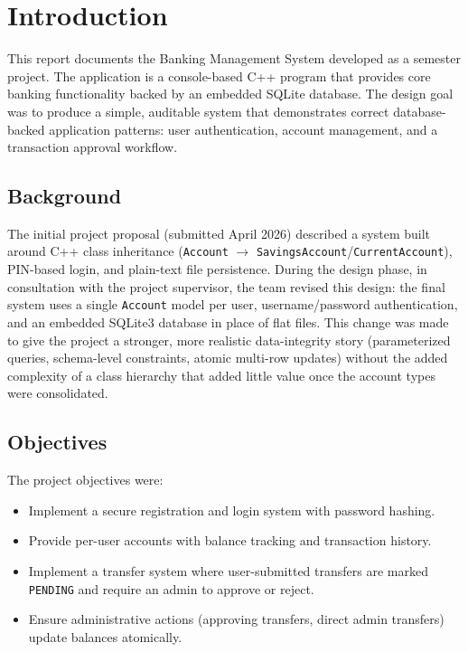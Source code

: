 \chapter{Introduction}

This report documents the Banking Management System developed as a semester project. The application is a console-based C++ program that provides core banking functionality backed by an embedded SQLite database. The design goal was to produce a simple, auditable system that demonstrates correct database-backed application patterns: user authentication, account management, and a transaction approval workflow.

\section{Background}
The initial project proposal (submitted April 2026) described a system built around C++ class inheritance (\texttt{Account} $\rightarrow$ \texttt{SavingsAccount}/\texttt{CurrentAccount}), PIN-based login, and plain-text file persistence. During the design phase, in consultation with the project supervisor, the team revised this design: the final system uses a single \texttt{Account} model per user, username/password authentication, and an embedded SQLite3 database in place of flat files. This change was made to give the project a stronger, more realistic data-integrity story (parameterized queries, schema-level constraints, atomic multi-row updates) without the added complexity of a class hierarchy that added little value once the account types were consolidated.

\section{Objectives}
The project objectives were:
\begin{itemize}
    \item Implement a secure registration and login system with password hashing.
    \item Provide per-user accounts with balance tracking and transaction history.
    \item Implement a transfer system where user-submitted transfers are marked \texttt{PENDING} and require an admin to approve or reject.
    \item Ensure administrative actions (approving transfers, direct admin transfers) update balances atomically.
\end{itemize}

